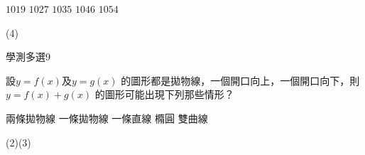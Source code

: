 \begin{QUESTIONS}
\begin{QUESTION}
\begin{QBODY}
            \begin{QOPS} 
 \QOP$1019$
            \QOP$1027$
            \QOP$1035$
            \QOP$1046$
            \QOP$1054$ 
            \end{QOPS}          
        \end{QBODY}
        \begin{QFROMS}
        \end{QFROMS}
        \begin{QTAGS}\end{QTAGS}
        \begin{QANS}
            (4)
        \end{QANS}
        \begin{QSOLLIST}
        \end{QSOLLIST}
        \begin{QEMPTYSPACE}
        \end{QEMPTYSPACE}
    \end{QUESTION}
\end{QUESTIONS}\begin{QUESTIONS}
    \begin{QUESTION}
        \begin{ExamInfo}{85}{學測}{多選}{9}
        \end{ExamInfo}
        \begin{ExamAnsRateInfo}{}{}{}{}
        \end{ExamAnsRateInfo}
        \begin{QBODY}
            	設$y=f\left( x \right)$及$y=g\left( x \right)$ 的圖形都是拋物線，一個開口向上，一個開口向下，則$y=f\left( x \right)+g\left( x \right)$ 的圖形可能出現下列那些情形？
            \begin{QOPS} 
            \QOP 兩條拋物線
            \QOP 一條拋物線
            \QOP 一條直線
            \QOP 橢圓
            \QOP 雙曲線
            \end{QOPS}            
        \end{QBODY}
        \begin{QFROMS}
        \end{QFROMS}
        \begin{QTAGS}\end{QTAGS}
        \begin{QANS}
            (2)(3)
        \end{QANS}
        \begin{QSOLLIST}
        \end{QSOLLIST}
        \begin{QEMPTYSPACE}

\end{QEMPTYSPACE}
\end{QUESTION}
\end{QUESTIONS}

